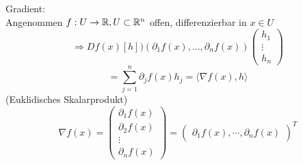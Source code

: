 \documentclass[../ana2.tex]{subfiles}
\begin{document}
Gradient: \\
Angenommen \(f:U\rightarrow \mathbb{R}, U \subset \mathbb{R}^n \) offen, differenzierbar
in \(x \in U\)
\[ \Rightarrow Df(x)[h] ) (\partial_1f(x), \dots, \partial_nf(x))\begin{pmatrix}
    h_1\\
    \vdots \\
    h_n
\end{pmatrix} \]
\[ = \sum_{j=1}^n \partial_jf(x) h_j = \langle \nabla f(x), h \rangle \]
(Euklidisches Skalarprodukt)
\[ \nabla f(x) = \begin{pmatrix}
    \partial_1 f(x) \\
    \partial_2 f(x) \\
    \vdots \\
    \partial_n f(x)
\end{pmatrix} = \begin{pmatrix}
    \partial_1 f(x), \cdots, \partial_n f(x)
\end{pmatrix}^T \]
\end{document}
